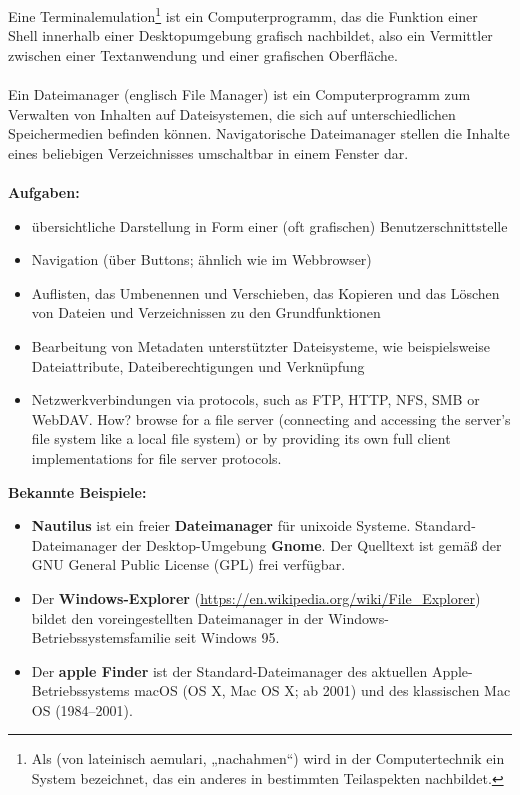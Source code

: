 Eine Terminalemulation\footnote{Als  (von lateinisch aemulari, „nachahmen“) wird in der Computertechnik ein System bezeichnet, das ein anderes in bestimmten Teilaspekten nachbildet.} ist ein Computerprogramm, das die Funktion einer Shell innerhalb einer Desktopumgebung grafisch nachbildet, also ein Vermittler zwischen einer Textanwendung und einer grafischen Oberfläche.
%
~\\
\\
Ein Dateimanager (englisch File Manager) ist ein Computerprogramm zum Verwalten von Inhalten auf Dateisystemen, die sich auf unterschiedlichen Speichermedien befinden können. Navigatorische Dateimanager stellen die Inhalte eines beliebigen Verzeichnisses umschaltbar in einem Fenster dar.\\
 ~\\
\textbf{Aufgaben:}
\begin{itemize}
	\item übersichtliche Darstellung in Form einer (oft grafischen) Benutzerschnittstelle
	\item Navigation (über Buttons; ähnlich wie im Webbrowser)
	\item Auflisten, das Umbenennen und Verschieben, das Kopieren und das Löschen von Dateien und Verzeichnissen zu den Grundfunktionen
	\item Bearbeitung von Metadaten unterstützter Dateisysteme, wie beispielsweise Dateiattribute, Dateiberechtigungen und Verknüpfung
	\item Netzwerkverbindungen via protocols, such as FTP, HTTP, NFS, SMB or WebDAV. How? browse for a file server (connecting and accessing the server's file system like a local file system) or by providing its own full client implementations for file server protocols.
\end{itemize}
\textbf{Bekannte Beispiele:} %
\begin{itemize}
	\item \textbf{Nautilus} ist ein freier \textbf{Dateimanager} für unixoide Systeme. Standard-Dateimanager der Desktop-Umgebung \textbf{Gnome}.	Der Quelltext ist gemäß der GNU General Public License (GPL) frei verfügbar.
	\item Der \textbf{Windows-Explorer} (\url{https://en.wikipedia.org/wiki/File_Explorer}) bildet den voreingestellten Dateimanager in der Windows-Betriebssystemsfamilie seit Windows 95.
	\item Der \textbf{apple Finder} ist der Standard-Dateimanager des aktuellen Apple-Betriebssystems macOS (OS X, Mac OS X; ab 2001) und des klassischen Mac OS (1984–2001).
\end{itemize}
